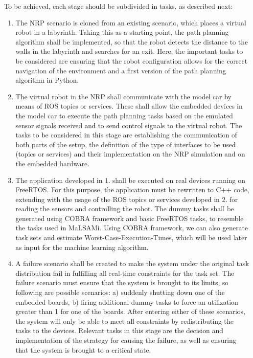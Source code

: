 To be achieved, each stage should be subdivided in tasks, as described next:
\begin{enumerate}
\item	The NRP scenario is cloned from an existing scenario, which places a virtual robot in a labyrinth. Taking this as a starting point, the path planning algorithm shall be implemented, so that the robot detects the distance to the walls in the labyrinth and searches for an exit. Here, the important tasks to be considered are ensuring that the robot configuration allows for the correct navigation of the environment and a first version of the path planning algorithm in Python.
\item	The virtual robot in the NRP shall communicate with the model car by means of ROS topics or services. These shall allow the embedded devices in the model car to execute the path planning tasks based on the emulated sensor signals received and to send control signals to the virtual robot. The tasks to be considered in this stage are establishing the communication of both parts of the setup, the definition of the type of interfaces to be used (topics or services) and their implementation on the NRP simulation and on the embedded hardware.
\item	The application developed in 1. shall be executed on real devices running on FreeRTOS. For this purpose, the application must be rewritten to C++ code, extending with the usage of the ROS topics or services developed in 2. for reading the sensors and controlling the robot. The dummy tasks shall be generated using COBRA framework and basic FreeRTOS tasks, to resemble the tasks used in MaLSAMi. Using COBRA framework, we can also generate task sets and estimate Worst-Case-Execution-Times, which will be used later as input for the machine learning algorithm.
\item	A failure scenario shall be created to make the system under the original task distribution fail in fulfilling all real-time constraints for the task set. The failure scenario must ensure that the system is brought to its limits, so following are possible scenarios: a) suddenly shutting down one of the embedded boards, b) firing additional dummy tasks to force an utilization greater than 1 for one of the boards. After entering either of these scenarios, the system will only be able to meet all constraints by redistributing the tasks to the devices. Relevant tasks in this stage are the decision and implementation of the strategy for causing the failure, as well as ensuring that the system is brought to a critical state.

\end{enumerate}
